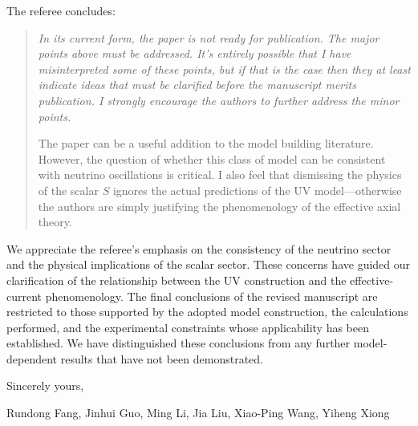 \documentclass[12pt,a4paper]{article}
\begin{document}
The referee concludes:

\begin{quote}
\itshape
In its current form, the paper is not ready for publication. The major points above must be addressed. It's entirely possible that I have misinterpreted some of these points, but if that is the case then they at least indicate ideas that must be clarified before the manuscript merits publication. I strongly encourage the authors to further address the minor points.

The paper can be a useful addition to the model building literature. However, the question of whether this class of model can be consistent with neutrino oscillations is critical. I also feel that dismissing the physics of the scalar \(S\) ignores the actual predictions of the UV model---otherwise the authors are simply justifying the phenomenology of the effective axial theory.
\end{quote}

We appreciate the referee's emphasis on the consistency of the neutrino sector and the physical implications of the scalar sector. These concerns have guided our clarification of the relationship between the UV construction and the effective-current phenomenology. The final conclusions of the revised manuscript are restricted to those supported by the adopted model construction, the calculations performed, and the experimental constraints whose applicability has been established. We have distinguished these conclusions from any further model-dependent results that have not been demonstrated.

\medskip

\noindent Sincerely yours,

\noindent Rundong Fang, Jinhui Guo, Ming Li, Jia Liu, Xiao-Ping Wang, Yiheng Xiong



\end{document}
